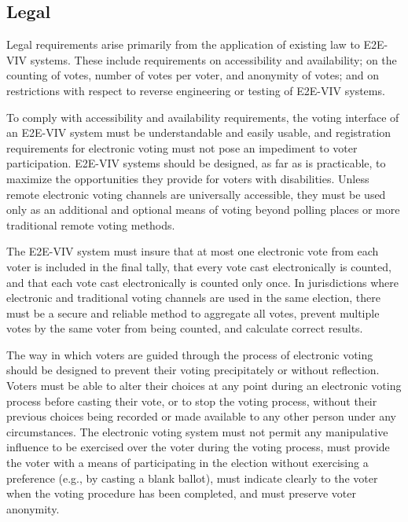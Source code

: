 \subsection{Legal}

Legal requirements arise primarily from the application of existing
law to E2E-VIV systems. These include requirements on accessibility
and availability; on the counting of votes, number of votes per voter,
and anonymity of votes; and on restrictions with respect to reverse
engineering or testing of E2E-VIV systems.

To comply with accessibility and availability requirements, the voting
interface of an E2E-VIV system must be understandable and easily
usable, and registration requirements for electronic voting must not
pose an impediment to voter participation. E2E-VIV systems should be
designed, as far as is practicable, to maximize the opportunities they
provide for voters with disabilities. Unless remote electronic voting
channels are universally accessible, they must be used only as an
additional and optional means of voting beyond polling places or more
traditional remote voting methods.

The E2E-VIV system must insure that at most one electronic vote from
each voter is included in the final tally, that every vote cast
electronically is counted, and that each vote cast electronically is
counted only once. In jurisdictions where electronic and traditional
voting channels are used in the same election, there must be a secure
and reliable method to aggregate all votes, prevent multiple votes by
the same voter from being counted, and calculate correct results.

The way in which voters are guided through the process of electronic
voting should be designed to prevent their voting precipitately or
without reflection. Voters must be able to alter their choices at any
point during an electronic voting process before casting their vote,
or to stop the voting process, without their previous choices being
recorded or made available to any other person under any
circumstances. The electronic voting system must not permit any
manipulative influence to be exercised over the voter during the
voting process, must provide the voter with a means of participating
in the election without exercising a preference (e.g., by casting a
blank ballot), must indicate clearly to the voter when the voting
procedure has been completed, and must preserve voter anonymity.

